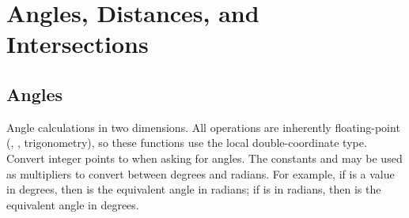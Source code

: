 \section{\texorpdfstring{Angles, Distances, and Intersections}{7.2 Angles, Distances, and Intersections}}
\setcounter{section}{2}
\setcounter{subsection}{0}
\subsection{Angles}
\label{sec:7.2.1}
Angle calculations in two dimensions. All operations are inherently floating-point (, , trigonometry), so these functions use the local double-coordinate  type. Convert integer points to  when asking for angles. The constants  and  may be used as multipliers to convert between degrees and radians. For example, if  is a value in degrees, then  is the equivalent angle in radians; if  is in radians, then  is the equivalent angle in degrees.

